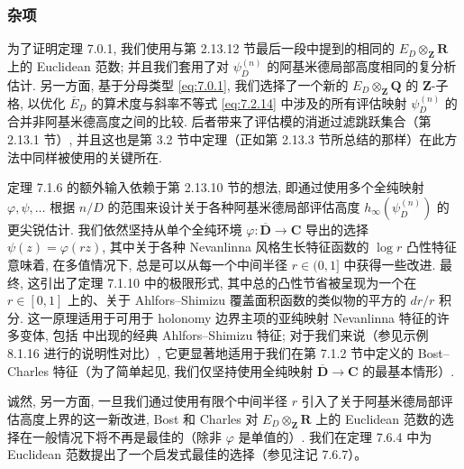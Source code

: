 \subsubsection{杂项}\label{sec:2.13.13}

为了证明定理 7.0.1, 我们使用与第 2.13.12 节最后一段中提到的相同的 \(E_D \otimes_{\mathbf{Z}} \mathbf{R}\) 上的 Euclidean 范数; 并且我们套用了对 \(\psi_D^{(n)}\) 的阿基米德局部高度相同的复分析估计. 另一方面, 基于分母类型 \eqref{eq:7.0.1}, 我们选择了一个新的 \(E_D \otimes_{\mathbf{Z}} \mathbf{Q}\) 的 \(\mathbf{Z}\)-子格, 以优化 \(\overline{E}_D\) 的算术度与斜率不等式 \eqref{eq:7.2.14} 中涉及的所有评估映射 \(\psi_D^{(n)}\) 的合并非阿基米德高度之间的比较. 后者带来了评估模的消逝过滤跳跃集合（第 2.13.1 节）, 并且这也是第 3.2 节中定理（正如第 2.13.3 节所总结的那样）在此方法中同样被使用的关键所在.

定理 7.1.6 的额外输入依赖于第 2.13.10 节的想法, 即通过使用多个全纯映射 \(\varphi, \psi, \dots\) 根据 \(n/D\) 的范围来设计关于各种阿基米德局部评估高度 \(h_{\infty}(\psi_D^{(n)})\) 的更尖锐估计. 我们依然坚持从单个全纯环境 \(\varphi: \overline{\mathbf{D}} \to \mathbf{C}\) 导出的选择 \(\psi(z) = \varphi(rz)\), 其中关于各种 Nevanlinna 风格生长特征函数的 \(\log r\) 凸性特征意味着, 在多值情况下, 总是可以从每一个中间半径 \(r \in (0,1]\) 中获得一些改进. 最终, 这引出了定理 7.1.10 中的极限形式, 其中总的凸性节省被呈现为一个在 \(r \in [0,1]\) 上的、关于 Ahlfors--Shimizu 覆盖面积函数的类似物的平方的 \(dr/r\) 积分. 这一原理适用于可用于 holonomy 边界主项的亚纯映射 Nevanlinna 特征的许多变体, 包括 \cite[Prop. 5.4.5]{BC22} 中出现的经典 Ahlfors--Shimizu 特征; 对于我们来说（参见示例 8.1.16 进行的说明性对比）, 它更显著地适用于我们在第 7.1.2 节中定义的 Bost--Charles 特征（为了简单起见, 我们仅坚持使用全纯映射 \(\overline{\mathbf{D}} \to \mathbf{C}\) 的最基本情形）.

诚然, 另一方面, 一旦我们通过使用有限个中间半径 \(r\) 引入了关于阿基米德局部评估高度上界的这一新改进, Bost 和 Charles 对 \(E_D \otimes_{\mathbf{Z}} \mathbf{R}\) 上的 Euclidean 范数的选择在一般情况下将不再是最佳的（除非 \(\varphi\) 是单值的）. 我们在定理 7.6.4 中为 Euclidean 范数提出了一个启发式最佳的选择（参见注记 7.6.7）。

